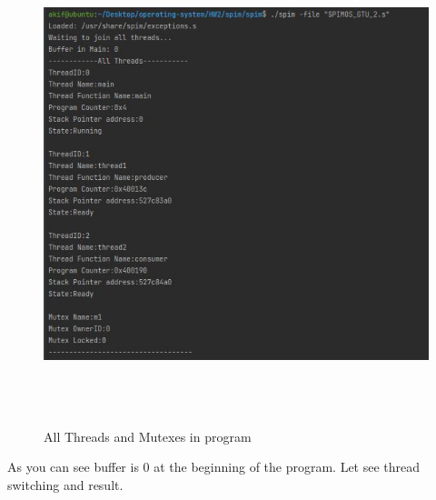 \documentclass{article}
\begin{document}
\begin{figure}[H]
    \centering
	\includegraphics[width=5in, height=5.5in]{24.JPG}
	\caption[Optional caption]{All Threads and Mutexes in program}
	\label{}
\end{figure}
\hfill \break
As you can see buffer is 0 at the beginning of the program. Let see thread switching and result.
\cleardoublepage
\end{document}
